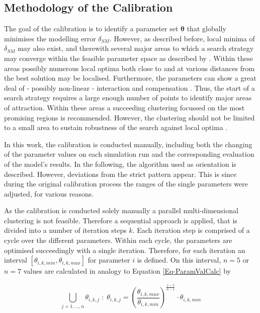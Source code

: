 \subsection{Methodology of the Calibration}
\label{Sec-SubMethCal}

The goal of the calibration is to identify a parameter set $\bm{\theta}$ that globally minimises the modelling error $\delta_{SM}$. 
However, as described before, local minima of $\delta_{SM}$ may also exist, and therewith several major areas to which a search strategy may converge within the feasible parameter space as described by \textcite{Duan.1993}. 
Within these areas possibly numerous local optima both close to and at various distances from the best solution may be localised. 
Furthermore, the parameters can show a great deal of - possibly non-linear - interaction and compensation \parencite{Duan.1993}. 
Thus, the start of a search strategy requires a large enough number of points to identify major areas of attraction. 
Within these areas a succeeding clustering focussed on the most promising regions is recommended. 
However, the clustering should not be limited to a small area to sustain robustness of the search against local optima \parencite{Duan.1993}.

In this work, the calibration is conducted manually, including both the changing of the parameter values on each simulation run and the corresponding evaluation of the model's results. 
In the following, the algorithm used as orientation is described. 
However, deviations from the strict pattern appear. 
This is since during the original calibration process the ranges of the single parameters were adjusted, for various reasons.

As the calibration is conducted solely manually a parallel multi-dimensional clustering is not feasible. 
Therefore a sequential approach is applied, that is divided into a number of iteration steps $k$. 
Each iteration step is comprised of a cycle over the different parameters. 
Within each cycle, the parameters are optimised succeedingly with a single iteration. 
Therefore, for each iteration an interval $[\theta_{i,k,min}, \theta_{i,k,max}]$ for parameter $i$ is defined. 
On this interval, $n=5$ or $n=7$ values are calculated in analogy to Equation \eqref{Eq-ParamValCalc} by

\begin{equation}
    \label{Eq-ParamValCalcCalib}
    \bigcup_{j=1,...,n} \theta_{i,k,j} \; : \; \theta_{i,k,j} = \left( \frac{\theta_{i,k,max}}{\theta_{i,k,min}} \right) ^{\frac{j-1}{n-1}} \cdot \theta_{i,k,min}
\end{equation}

